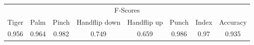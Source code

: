 \documentclass{standalone}
\begin{document}
 
 \begin{tabular}{|c|c|c|c|c|c|c ||c|}
\cline{1-8}\multicolumn{8}{|c|}{F-Scores} \\ 
\cline{1-8}Tiger & Palm & Pinch & Handflip down & Handflip up & Punch & Index & Accuracy\\ 
\cline{1-8}0.956 & 0.964 & 0.982 & 0.749 & 0.659 & 0.986 & 0.97 & 0.935\\ 
 \cline{1-8}\hline \end{tabular}
 
\end{document}
